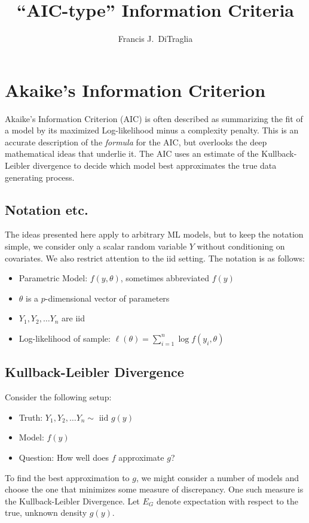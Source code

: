 \documentclass[12pt]{article}
\theoremstyle{definition}
\begin{document}
\title{``AIC-type'' Information Criteria}

\author{Francis J.\ DiTraglia}

\maketitle 




\section{Akaike's Information Criterion}
Akaike's Information Criterion (AIC) is often described as summarizing the fit of a model by its maximized Log-likelihood minus a complexity penalty. This is an accurate description of the \emph{formula} for the AIC, but overlooks the deep mathematical ideas that underlie it. The AIC uses an estimate of the Kullback-Leibler divergence to decide which model best approximates the true data generating process.


\subsection{Notation etc.}
The ideas presented here apply to arbitrary ML models, but to keep the notation simple, we consider only a scalar random variable $Y$ without conditioning on covariates. We also restrict attention to the iid setting.  The notation is as follows:
		\begin{itemize}
			\item Parametric Model: $f\left(y,\theta\right)$, sometimes abbreviated $f(y)$
			\item $\theta$ is a $p$-dimensional vector of parameters
			\item $Y_1, Y_2, \hdots Y_n$ are iid 
			\item Log-likelihood of sample: $\ell(\theta) = \sum_{i=1}^n \log{f\left(y_i,\theta\right)}$
		\end{itemize}


\subsection{Kullback-Leibler Divergence}
Consider the following setup:
	\begin{itemize}
		\item Truth: $Y_1, Y_2, \hdots Y_n \sim \mbox{ iid } g(y)$
		\item Model: $f(y)$
		\item Question: How well does $f$ approximate $g$?
	\end{itemize}
To find the best approximation to $g$, we might consider a number of models and choose the one that minimizes some measure of discrepancy. One such measure is the Kullback-Leibler Divergence. Let $E_G$ denote expectation with respect to the true, unknown density $g(y)$.
\end{document}
